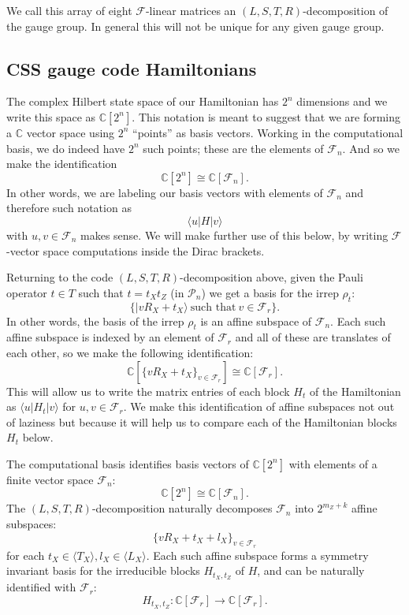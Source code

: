 \documentclass[11pt,oneside]{article}
\def\Complex{\mathbb{C}}
\def\Pauli{\mathcal{P}}
\newcommand{\ket}[1]{|{#1}\rangle}
\newcommand{\bra}[1]{\langle{#1}|}
\def\Span#1{\langle #1 \rangle}
\newcommand{\Field}{\mathcal{F}}
\def\Fnd{\Field_{n}}
\def\Frd{\Field_{r}}
\renewenvironment{framed}
{\begin{samepage}
\MakeFramed{\hsize0.8\linewidth\advance\hsize-\width\FrameRestore}}
{\endMakeFramed\end{samepage}}
\begin{document}
We call this array of eight $\Field$-linear 
matrices
an $(L,S,T,R)$-decomposition of the gauge group.
In general this will not be unique for
any given gauge group.

\subsection{CSS gauge code Hamiltonians}

The complex Hilbert state space of our
Hamiltonian has $2^n$ dimensions and we
write this space as $\Complex[2^n]$.
This notation is meant to suggest that
we are forming a $\Complex$ vector space
using $2^n$ ``points'' 
as basis vectors.
Working in the computational basis,
we do indeed have $2^n$ such points; 
these are the elements of $\Fnd.$
And so we make the identification
$$
    \Complex[2^n] \cong \Complex[\Fnd].
$$
In other words, we are labeling 
our basis vectors with elements of $\Fnd$
and therefore such notation as
$$
    \bra{u} H \ket{v}
$$
with $u, v \in \Fnd$ makes sense.
We will make further use of this below,
by writing  $\Field$-vector space 
computations inside the Dirac brackets.

Returning to the code $(L,S,T,R)$-decomposition
above,
given the Pauli operator $t\in T$ such that $t = t_X t_Z$ (in $\Pauli_n$)
we get a basis for the irrep $\rho_t$:
$$
    \{ \ket{v R_X + t_X} \ \mbox{such that}\  v \in \Frd \}.
$$
In other words,
the basis of the irrep $\rho_t$ is 
an affine subspace of $\Fnd.$
Each such affine subspace is indexed by an
element of $\Frd$ and
all of these are
translates of each other,
so we make the following identification:
$$
\Complex[\{vR_X+t_X\}_{v\in\Frd}]
\cong \Complex[\Frd].
$$
This will allow us to write the matrix entries
of each block $H_t$ of the Hamiltonian
as $\bra{u}H_t\ket{v}$ for $u,v\in\Frd.$
We make this identification of affine subspaces
not out of laziness but because it will
help us to compare each of
the Hamiltonian blocks $H_t$ below.

\begin{framed}
\noindent
The computational basis identifies
basis vectors of $\Complex[2^n]$
with elements of a finite vector space $\Fnd$:
$$
    \Complex[2^n] \cong \Complex[\Fnd].
$$
The $(L,S,T,R)$-decomposition naturally
decomposes $\Fnd$ into $2^{m_Z+k}$ affine subspaces:
$$
    \{ v R_X + t_X + l_X \}_{v\in\Frd}
$$
for each $t_X \in \Span{T_X}, l_X \in \Span{L_X}.$
Each such affine subspace forms a
symmetry invariant basis
for the irreducible blocks $H_{t_X,t_Z}$ of $H$,
and can be naturally identified with $\Frd:$
$$
    H_{t_X,t_Z} : \Complex[\Frd] \to \Complex[\Frd].
$$
\end{framed}
\end{document}
